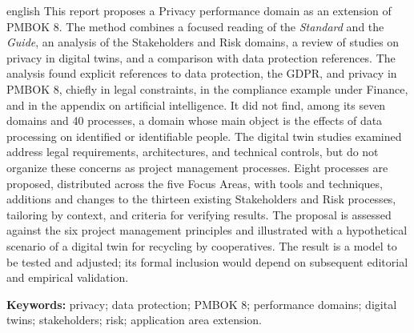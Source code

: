 \documentclass[12pt,a4paper,article,oneside,english,brazil]{abntex2}
\begin{document}
\begin{resumo}[Abstract]
\begin{otherlanguage*}{english}
This report proposes a Privacy performance domain as an extension of PMBOK 8. The method combines a focused reading of the \textit{Standard} and the \textit{Guide}, an analysis of the Stakeholders and Risk domains, a review of studies on privacy in digital twins, and a comparison with data protection references. The analysis found explicit references to data protection, the GDPR, and privacy in PMBOK 8, chiefly in legal constraints, in the compliance example under Finance, and in the appendix on artificial intelligence. It did not find, among its seven domains and 40 processes, a domain whose main object is the effects of data processing on identified or identifiable people. The digital twin studies examined address legal requirements, architectures, and technical controls, but do not organize these concerns as project management processes. Eight processes are proposed, distributed across the five Focus Areas, with tools and techniques, additions and changes to the thirteen existing Stakeholders and Risk processes, tailoring by context, and criteria for verifying results. The proposal is assessed against the six project management principles and illustrated with a hypothetical scenario of a digital twin for recycling by cooperatives. The result is a model to be tested and adjusted; its formal inclusion would depend on subsequent editorial and empirical validation.

\vspace{\onelineskip}
\noindent\textbf{Keywords:} privacy; data protection; PMBOK 8; performance domains; digital twins; stakeholders; risk; application area extension.
\end{otherlanguage*}
\end{resumo}

\clearpage

\tableofcontents
\clearpage
\listoffigures
\clearpage
\listoftables
\clearpage
\end{document}
